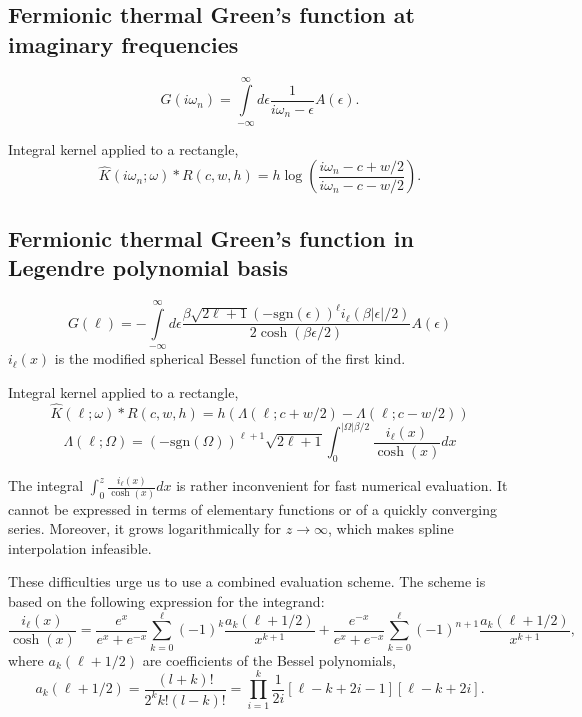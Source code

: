 \documentclass[]{article}
\begin{document}
\subsection{Fermionic thermal Green's function at imaginary frequencies}
\begin{equation}
	G(i\omega_n) = \int\limits_{-\infty}^\infty
	d\epsilon \frac{1}{i\omega_n-\epsilon} A(\epsilon).
\end{equation}

Integral kernel applied to a rectangle,
\begin{equation}
	\hat K(i\omega_n;\omega)*R(c,w,h) = 
	h \log\left(\frac{i\omega_n - c + w/2}{i\omega_n - c - w/2}\right).
\end{equation}

\subsection{Fermionic thermal Green's function in Legendre polynomial basis}
\begin{equation}
	G(\ell) = -\int\limits_{-\infty}^\infty
	d\epsilon \frac{\beta\sqrt{2\ell+1}(-\mathrm{sgn}(\epsilon))^\ell i_{\ell}(\beta|\epsilon|/2)}
	{2\cosh(\beta\epsilon/2)} A(\epsilon)
\end{equation}
$i_\ell(x)$ is the modified spherical Bessel function of the first kind.

Integral kernel applied to a rectangle,
\begin{equation}
	\hat K(\ell;\omega)*R(c,w,h) = h (\Lambda(\ell;c+w/2) - \Lambda(\ell;c-w/2)) 
\end{equation}
\begin{equation}
	\Lambda(\ell;\Omega) = (-\mathrm{sgn}(\Omega))^{\ell+1}\sqrt{2\ell+1}
	\int_0^{|\Omega|\beta/2} \frac{i_\ell(x)}{\cosh(x)} dx
\end{equation}

The integral $\int_0^z \frac{i_\ell(x)}{\cosh(x)} dx$ is rather inconvenient for fast numerical evaluation. It cannot be expressed in terms of elementary functions or of a quickly converging series. Moreover, it grows logarithmically for $z\to\infty$, which makes spline interpolation infeasible.

These difficulties urge us to use a combined evaluation scheme. The scheme is based on the following expression for the integrand:
\begin{equation}\label{il_cosh_series}
	\frac{i_\ell(x)}{\cosh(x)} =
	\frac{e^x}{e^x+e^{-x}}\sum_{k=0}^\ell(-1)^k
		\frac{a_k(\ell+1/2)}{x^{k+1}} +
	\frac{e^{-x}}{e^x+e^{-x}}\sum_{k=0}^\ell(-1)^{n+1}
		\frac{a_k(\ell+1/2)}{x^{k+1}},
\end{equation}
where $a_k(\ell+1/2)$ are coefficients of the Bessel polynomials,
\begin{equation}
	a_k(\ell+1/2) = \frac{(l+k)!}{2^k k!(l-k)!} =
	\prod_{i=1}^k \frac{1}{2i}[\ell-k+2i-1][\ell-k+2i].
\end{equation}
\end{document}
